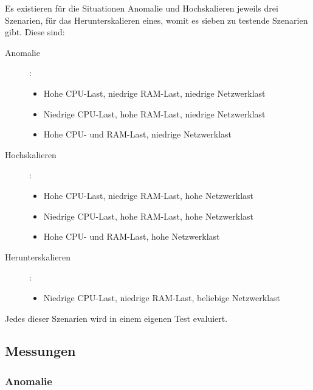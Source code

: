 \documentclass[a4paper,10pt]{scrartcl}
\begin{document}
Es existieren für die Situationen Anomalie und Hochskalieren jeweils drei Szenarien, für das Herunterskalieren eines, womit es sieben zu testende Szenarien gibt.
Diese sind:

\begin{description}
\item[Anomalie]:
\begin{itemize}
\item Hohe CPU-Last, niedrige RAM-Last, niedrige Netzwerklast
\item Niedrige CPU-Last, hohe RAM-Last, niedrige Netzwerklast
\item Hohe CPU- und RAM-Last, niedrige Netzwerklast
\end{itemize}
\item[Hochskalieren]:
\begin{itemize}
\item Hohe CPU-Last, niedrige RAM-Last, hohe Netzwerklast
\item Niedrige CPU-Last, hohe RAM-Last, hohe Netzwerklast
\item Hohe CPU- und RAM-Last, hohe Netzwerklast
\end{itemize}
\item[Herunterskalieren]:
\begin{itemize}
\item Niedrige CPU-Last, niedrige RAM-Last, beliebige Netzwerklast
\end{itemize}
\end{description}

Jedes dieser Szenarien wird in einem eigenen Test evaluiert.

\pagebreak
\subsection{Messungen}

\subsubsection{Anomalie}
\end{document}

